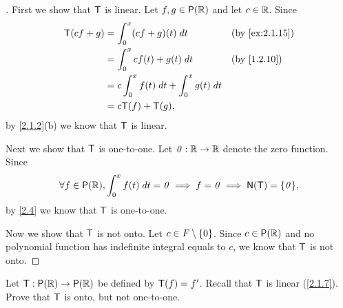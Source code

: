 \begin{proof}[]
  First we show that \(\mathsf{T}\) is linear.
  Let \(f, g \in \ps{\R}\) and let \(c \in \mathbb{R}\).
  Since
  \begin{align*}
    \T(cf + g) & = \int_0^x (cf + g)(t) \; dt                  &  & \by{ex:2.1.15} \\
               & = \int_0^x cf(t) + g(t) \; dt                 &  & \by{1.2.10}    \\
               & = c \int_0^x f(t) \; dt + \int_0^x g(t) \; dt                     \\
               & = c \T(f) + \T(g),
  \end{align*}
  by \cref{2.1.2}(b) we know that \(\mathsf{T}\) is linear.

  Next we show that \(\mathsf{T}\) is one-to-one.
  Let \(\mathit{0} : \mathbb{R} \to \mathbb{R}\) denote the zero function.
  Since
  \[
    \forall f \in \ps{\R}, \int_0^x f(t) \; dt = \zv \implies f = \zv \implies \ns{\T} = \set{\zv},
  \]
  by \cref{2.4} we know that \(\mathsf{T}\) is one-to-one.

  Now we show that \(\mathsf{T}\) is not onto.
  Let \(c \in \mathit{F} \setminus \left\lbrace0\right\rbrace\).
  Since \(c \in \ps{\R}\) and no polynomial function has indefinite integral equals to \(c\), we know that \(\mathsf{T}\) is not onto.
\end{proof}

\begin{ex}\label{ex:2.1.16}
  Let \(\T : \ps{\R} \to \ps{\R}\) be defined by \(\mathsf{T}(f) = f'\).
  Recall that \(\mathsf{T}\) is linear (\cref{2.1.7}).
  Prove that \(\mathsf{T}\) is onto, but not one-to-one.
\end{ex}

